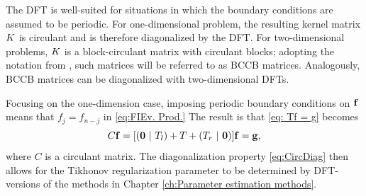 The DFT is well-suited for situations in which the boundary conditions are assumed to be periodic. For one-dimensional problem, the resulting kernel matrix $K$ is circulant and is therefore diagonalized by the DFT. For two-dimensional problems, $K$ is a block-circulant matrix with circulant blocks; adopting the notation from \cite[p.~71-72]{Vogel:2002}, such matrices will be referred to as BCCB matrices. Analogously, BCCB matrices can be diagonalized with two-dimensional DFTs. \par 
Focusing on the one-dimension case, imposing periodic boundary conditions on $\mathbf{f}$ means that $f_j = f_{n-j}$ in \eqref{eq:FIEv. Prod.} The result is that \eqref{eq: Tf = g} becomes
\[ C\mathbf{f} = [(\boldsymbol{0} ~|~ T_l) + T + (T_r ~|~ \boldsymbol{0})]\mathbf{f} = \mathbf{g},\]
where $C$ is a circulant matrix. The diagonalization property \eqref{eq:CircDiag} then allows for the Tikhonov regularization parameter to be determined by DFT-versions of the methods in Chapter \ref{ch:Parameter estimation methods}. 

